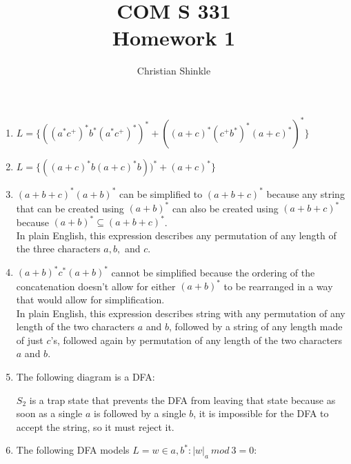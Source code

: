 \documentclass{article}
\newcommand{\FIG}[1]{\begin{center}
  \mbox{\epsfclipoff\epsffile{#1.eps}}
  \end{center}}
\def\epsfsize#1#2{0.7#1}	      %
\begin{document}
	\title{COM S 331\large \\Homework 1}
	\author{Christian Shinkle}
	\maketitle
	\begin{enumerate}
		\item $L = \{((a^*c^+)^*b^*(a^*c^+)^*)^*+((a+c)^*(c^+b^*)^*(a+c)^*)^*\}$
		\item $L = \{((a+c)^*b(a+c)^*b))^*+(a+c)^*\}$
		\item $(a+b+c)^*(a+b)^*$ can be simplified to $(a+b+c)^*$ because any string that can be created using $(a+b)^*$ can also be created using $(a+b+c)^*$ because $(a+b)^*\subseteq(a+b+c)^*$.\\
		In plain English, this expression describes any permutation of any length of the three characters $a, b,$ and $c$.
		\item $(a+b)^*c^*(a+b)^*$ cannot be simplified because the ordering of the concatenation doesn't allow for either $(a+b)^*$ to be rearranged in a way that would allow for simplification.\\
		In plain English, this expression describes string with any permutation of any length of the two characters $a$ and $b$, followed by a string of any length made of just $c$'s, followed again by permutation of any length of the two characters $a$ and $b$.
		\item The following diagram is a DFA:\\
		\FIG{DFA1}
		$S_2$ is a trap state that prevents the DFA from leaving that state because as soon as a single $a$ is followed by a single $b$, it is impossible for the DFA to accept the string, so it must reject it.
		\item The following DFA models $L={w\in{a,b}^* : |w|_a\ mod\ 3=0}$:\\
		{\def\epsfsize#1#2{0.8#1}}\FIG{DFA2}
		
	\end{enumerate}
\end{document}
